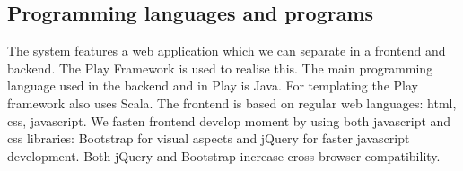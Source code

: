 	\subsection{Programming languages and programs}
	The system features a web application which we can separate in a frontend and backend. The Play Framework is used to realise this. The main programming language used in the backend and in Play is Java. For templating the Play framework also uses Scala. The frontend is based on regular web languages: html, css, javascript. We fasten frontend develop moment by using both javascript and css libraries: Bootstrap for visual aspects and jQuery for faster javascript development. Both jQuery and Bootstrap increase cross-browser compatibility.